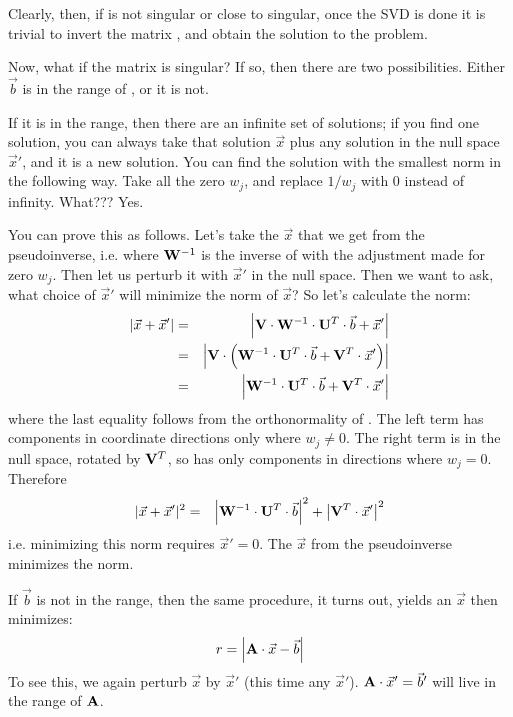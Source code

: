Clearly, then, if  is not singular or close to singular, once
the SVD is done it is trivial to invert the matrix , and obtain
the solution to the problem.

Now, what if the matrix  is singular? If so, then there are two
possibilities. Either $\vec{b}$ is in the range of , or it is
not.

If it is in the range, then there are an infinite set of solutions; if
you find one solution, you can always take that solution $\vec{x}$
plus any solution in the null space $\vec{x}'$, and it is a new
solution.  You can find the solution with the smallest norm in the
following way. Take all the zero $w_j$, and replace $1/w_j$ with 0
instead of infinity. What??? Yes.

You can prove this as follows. Let's take the $\vec{x}$ that we get
from the pseudoinverse, i.e. where ${\bf W}^{-1}$ is the inverse
of  with the adjustment made for zero $w_j$. Then let us
perturb it with $\vec{x}'$ in the null space. Then we want to ask,
what choice of $\vec{x}'$ will minimize the norm of $\vec{x}$? So
let's calculate the norm:
\begin{eqnarray}
|\vec{x} + \vec{x}'|
&=& \left| {\bf V}\cdot{\bf W}^{-1} \cdot {\bf U}^T\cdot \vec{b}
+ \vec{x}'\right| \cr
&=& \left| {\bf V}\cdot \left({\bf W}^{-1} \cdot {\bf U}^T\cdot \vec{b}
+ {\bf V}^T \cdot \vec{x}' \right)\right| \cr
&=& \left| {\bf W}^{-1} \cdot {\bf U}^T\cdot \vec{b}
+ {\bf V}^T\cdot \vec{x}'\right| 
\end{eqnarray}
where the last equality follows from the orthonormality of .
The left term has components in coordinate directions only where
$w_j\ne 0$. The right term is in the null space, rotated by
${\bf V}^T$, so has only components in directions where
$w_j=0$. Therefore 
\begin{eqnarray}
|\vec{x} + \vec{x}'|^2
&=& \left| {\bf W}^{-1} \cdot {\bf U}^T\cdot \vec{b}\right|^2
+ \left| {\bf V}^T\cdot \vec{x}'\right|^2
\end{eqnarray}
i.e. minimizing this norm requires $\vec{x}'=0$. The $\vec{x}$ from
the pseudoinverse minimizes the norm.

If $\vec{b}$ is not in the range, then the same procedure, it turns
out, yields an $\vec{x}$ then minimizes:
\begin{equation}
r = \left|{\bf A}\cdot\vec{x} - \vec{b}\right|
\end{equation}
To see this, we again perturb $\vec{x}$ by $\vec{x}'$ (this time any
$\vec{x}'$). ${\bf A}\cdot\vec{x}' = \vec{b}'$ will live in the range
of ${\bf A}$.

